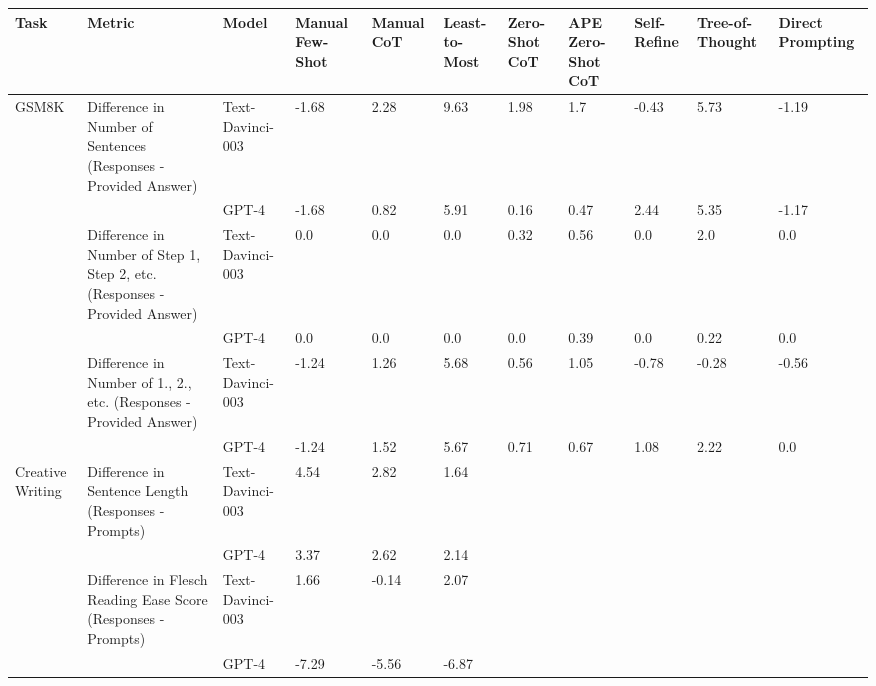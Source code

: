 \begin{tabular}{x{0.75cm}|x{1.5cm}|x{0.75cm}|x{0.75cm}|x{0.75cm}|x{0.75cm}|x{0.75cm}|x{0.75cm}|x{0.75cm}|x{0.75cm}|x{0.75cm}}
\toprule
\hline
Task & Metric & Model & Manual Few-Shot & Manual CoT & Least-to-Most & Zero-Shot CoT & APE Zero-Shot CoT & Self-Refine & Tree-of-Thought & Direct Prompting \\
\hline
\midrule
GSM8K & Difference in Number of Sentences (Responses - Provided Answer) & Text-Davinci-003 & -1.68 & 2.28 & 9.63 & 1.98 & 1.7 & -0.43 & 5.73 & -1.19 \\
\hline
 &  & GPT-4 & -1.68 & 0.82 & 5.91 & 0.16 & 0.47 & 2.44 & 5.35 & -1.17 \\
\hline
 & Difference in Number of Step 1, Step 2, etc. (Responses - Provided Answer) & Text-Davinci-003 & 0.0 & 0.0 & 0.0 & 0.32 & 0.56 & 0.0 & 2.0 & 0.0 \\
\hline
 &  & GPT-4 & 0.0 & 0.0 & 0.0 & 0.0 & 0.39 & 0.0 & 0.22 & 0.0 \\
\hline
 & Difference in Number of 1., 2., etc. (Responses - Provided Answer) & Text-Davinci-003 & -1.24 & 1.26 & 5.68 & 0.56 & 1.05 & -0.78 & -0.28 & -0.56 \\
\hline
 &  & GPT-4 & -1.24 & 1.52 & 5.67 & 0.71 & 0.67 & 1.08 & 2.22 & 0.0 \\
\hline
Creative Writing & Difference in Sentence Length (Responses - Prompts) & Text-Davinci-003 & 4.54 & 2.82 & 1.64 &  &  &  &  &  \\
\hline
 &  & GPT-4 & 3.37 & 2.62 & 2.14 &  &  &  &  &  \\
\hline
 & Difference in Flesch Reading Ease Score (Responses - Prompts) & Text-Davinci-003 & 1.66 & -0.14 & 2.07 &  &  &  &  &  \\
\hline
 &  & GPT-4 & -7.29 & -5.56 & -6.87 &  &  &  &  &  \\
\hline
\bottomrule
\end{tabular}

